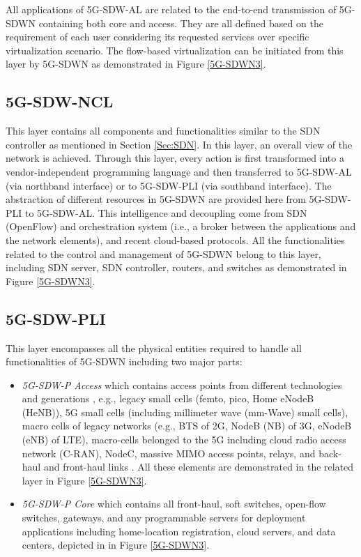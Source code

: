 \documentclass[conference]{IEEEtran}
\begin{document}
All applications of 5G-SDW-AL are related to the end-to-end transmission of 5G-SDWN containing both core and access. They are all defined based on the requirement of each user considering its requested services over specific virtualization scenario. The flow-based virtualization can be initiated from this layer by 5G-SDWN as demonstrated in Figure \ref{5G-SDWN3}. 

\subsection{5G-SDW-NCL} This layer contains all components and functionalities similar to the SDN controller as mentioned in Section \ref{Sec:SDN}. In this layer, an overall view of the network is achieved. Through this layer, every action is first transformed into a vendor-independent programming language and then transferred to 5G-SDW-AL (via northband interface) or to 5G-SDW-PLI (via southband interface). The abstraction of different resources in 5G-SDWN are provided here from 5G-SDW-PLI to 5G-SDW-AL. This intelligence and decoupling come from SDN (OpenFlow) and orchestration system (i.e., a broker between the applications and the network elements), and recent cloud-based protocols. All the functionalities related to the control and management of 5G-SDWN belong to this layer, including SDN server, SDN controller, routers, and switches as demonstrated in Figure \ref{5G-SDWN3}.

\subsection{5G-SDW-PLI} This layer encompasses all the physical entities required to handle all functionalities of 5G-SDWN including two major parts: 
	\begin{itemize}
	\item \textit{5G-SDW-P Access} which contains access points from different technologies and generations \cite{7113226}, e.g., legacy small cells (femto, pico, Home eNodeB (HeNB)), 5G small cells (including millimeter wave (mm-Wave) small cells), macro cells of legacy networks (e.g., BTS of 2G, NodeB (NB) of 3G, eNodeB (eNB) of LTE), macro-cells belonged to the 5G including cloud radio access network (C-RAN), NodeC, massive MIMO access points, relays, and back-haul and front-haul links \cite{7064897}. All these elements are demonstrated in the related layer in Figure \ref{5G-SDWN3}.
	\item \textit{5G-SDW-P Core} which contains all front-haul, soft switches, open-flow switches, gateways, and any programmable servers for deployment applications including home-location registration, cloud servers, and data centers, depicted in in Figure \ref{5G-SDWN3}. 
	\end{itemize}
 
\end{document}
